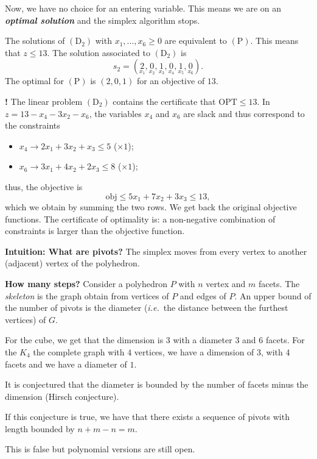 \documentclass[./main]{subfiles}
\begin{document}
  Now, we have no choice for an entering variable.
  This means we are on an \textit{\textbf{optimal solution}} and the simplex algorithm stops.

  The solutions of $(\mathrm{D}_2)$ with $x_1, \ldots, x_6 \ge 0$ are equivalent to $(\mathrm{P})$.
  This means that $z \le 13$.
  The solution associated to $(\mathrm{D}_2)$ is \[
    s_2 = (\underset{x_1} 2, \underset{x_2} 0, \underset{x_3} 1, \underset{x_4} 0, \underset{x_5} 1, \underset{x_6} 0)
  .\]
  The optimal for $(\mathrm{P})$ is $(2, 0, 1)$ for an objective of $13$.

  \textbf{\LARGE !}
  The linear problem $(\mathrm{D}_2)$ contains the certificate that $\mathrm{OPT} \le 13$.
  In $z = 13 - x_4 - 3x_2 - x_6$, the variables $x_4$ and $x_6$ are slack and thus correspond to the constraints
  \begin{itemize}
    \item $x_4 \to 2x_1 + 3x_2 + x_3 \le 5$ ($\times 1$);
    \item $x_6 \to 3x_1 + 4x_2 + 2x_3 \le 8$ ($\times 1$);
  \end{itemize}
  thus, the objective is \[
  \mathrm{obj} \le  5x_1 + 7x_2 + 3x_3 \le 13
  ,\]
  which we obtain by summing the two rows.
  We get back the original objective functions.
  The certificate of optimality is: a non-negative combination of constraints is larger than the objective function.


  \textbf{Intuition: What are pivots?}
  The simplex moves from every vertex to another (adjacent) vertex of the polyhedron.


  \textbf{How many steps?}
  Consider a polyhedron $P$ with $n$ vertex and $m$ facets.
  The \textit{skeleton} is the graph obtain from vertices of $P$ and edges of $P$.
  An upper bound of the number of pivots is the diameter (\textit{i.e.}\ the distance between the furthest vertices) of $G$.

  For the cube, we get that the dimension is $3$ with a diameter $3$ and $6$ facets.
  For the $K_4$ the complete graph with $4$ vertices, we have a dimension of $3$, with $4$ facets and we have a diameter of $1$.

  It is conjectured that the diameter is bounded by the number of facets minus the dimension (Hirsch conjecture).

  If this conjecture is true, we have that there exists a sequence of pivots with length bounded by $n + m - n = m$.

  This is false but polynomial versions are still open.
\end{document}
